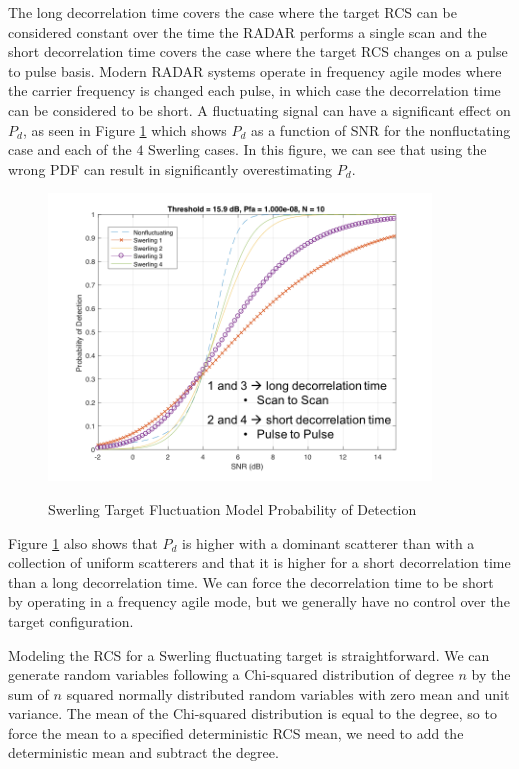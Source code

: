 The long decorrelation time covers the case where the target RCS can be considered constant over the time the RADAR performs a single scan and the short decorrelation time covers the case where the target RCS changes on a pulse to pulse basis. Modern RADAR systems operate in frequency agile modes where the carrier frequency is changed each pulse, in which case the decorrelation time can be considered to be short. A fluctuating signal can have a significant effect on $P_d$, as seen in Figure \ref{env_fig:4} which shows $P_d$ as a function of SNR for the nonfluctating case and each of the $4$ Swerling cases. In this figure, we can see that using the wrong PDF can result in significantly overestimating $P_d$.
\begin{figure}[H]
  \begin{center}
\includegraphics[width=4in]{../media/multistatic/swerling_pd.png}
  \end{center}
  \renewcommand{\baselinestretch}{1} \small\normalsize
  \begin{quote}
    \caption[Swerling Target Fluctuation Model Probability of Detection]{Swerling Target Fluctuation Model Probability of Detection\label{env_fig:4}}
  \end{quote}
\end{figure}
\renewcommand{\baselinestretch}{2} \small\normalsize

Figure \ref{env_fig:4} also shows that $P_d$ is higher with a dominant scatterer than with a collection of uniform scatterers and that it is higher for a short decorrelation time than a long decorrelation time. We can force the decorrelation time to be short by operating in a frequency agile mode, but we generally have no control over the target configuration.

Modeling the RCS for a Swerling fluctuating target is straightforward. We can generate random variables following a Chi-squared distribution of degree $n$ by the sum of $n$ squared normally distributed random variables with zero mean and unit variance. The mean of the Chi-squared distribution is equal to the degree, so to force the mean to a specified deterministic RCS mean, we need to add the deterministic mean and subtract the degree.

